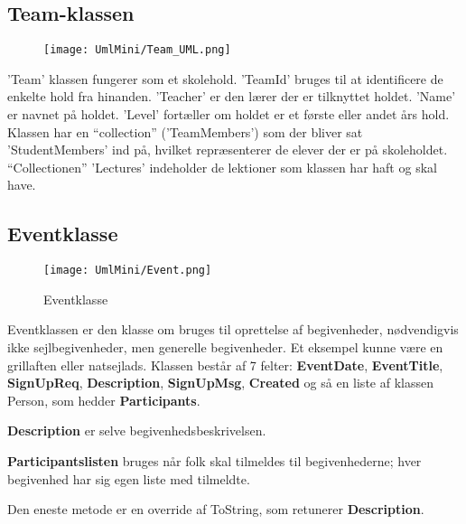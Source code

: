 \subsection{Team-klassen}
\begin{minipage}[t]{1\linewidth}
\begin{wrapfigure}{l}{0.5\textwidth}
\texttt{[image: UmlMini/Team\_UML.png]}
\end{wrapfigure}

'Team' klassen fungerer som et skolehold. 'TeamId' bruges til at identificere de enkelte hold fra hinanden. 'Teacher' er den lærer der er tilknyttet holdet. 'Name' er navnet på holdet. 'Level' fortæller om holdet er et første eller andet års hold. Klassen har en ``collection'' ('TeamMembers') som der bliver sat 'StudentMembers' ind på, hvilket repræsenterer de elever der er på skoleholdet. ``Collectionen'' 'Lectures' indeholder de lektioner som klassen har haft og skal have. 

\end{minipage}
 
 
\subsection{Eventklasse}

\begin{wrapfigure}{l}{0.5\textwidth}
    \label{img:login_interface}
    \vspace{-20pt}
    \begin{center}
        \texttt{[image: UmlMini/Event.png]}
    \end{center}
    \vspace{-20pt}
    \caption{Eventklasse}
    \vspace{-10pt}
\end{wrapfigure}
Eventklassen er den klasse om bruges til oprettelse af  begivenheder, nødvendigvis ikke sejlbegivenheder, men generelle begivenheder. Et eksempel kunne være en grillaften eller natsejlads. Klassen består af 7 felter: \textbf{EventDate}, \textbf{EventTitle}, \textbf{SignUpReq}, \textbf{Description}, \textbf{SignUpMsg}, \textbf{Created} og så en liste af klassen Person, som hedder \textbf{Participants}.

\textbf{Description} er selve begivenhedsbeskrivelsen. 

\textbf{Participantslisten} bruges når folk skal tilmeldes til begivenhederne; hver begivenhed har sig egen liste med tilmeldte. 

Den eneste metode er en override af ToString, som retunerer \textbf{Description}.

